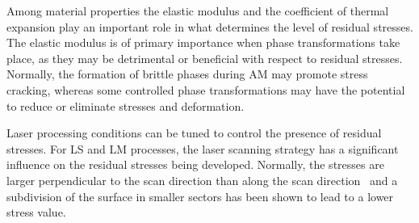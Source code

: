 Among material properties the elastic modulus and the coefficient of thermal expansion play an important role in what determines the level of residual stresses.
The elastic modulus is of primary importance when phase transformations take place, as they may be detrimental or beneficial with respect to residual stresses. Normally, the formation of brittle phases during AM may promote stress cracking, whereas some controlled phase transformations may have the potential to reduce or eliminate stresses and deformation.

Laser processing conditions can be tuned to control the presence of residual stresses. For LS and LM processes, the laser scanning strategy has a significant influence on the residual stresses being developed. Normally, the stresses are larger perpendicular to the scan direction than along the scan direction~\cite{Simchi2003:GuREVIEW173}  and a  subdivision of the surface in smaller sectors has been shown to lead to a lower stress value.


